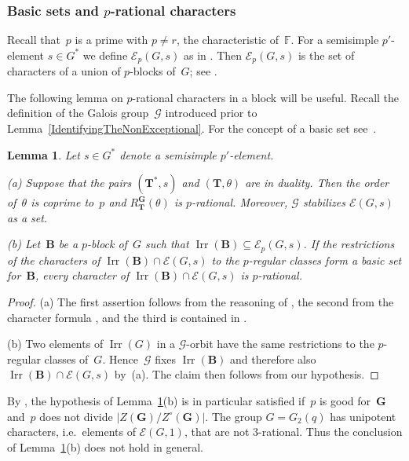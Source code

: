 \documentclass[12pt]{amsart}
\newcommand{\bG}{{\mathbf{G}}}      %
\newcommand{\bB}{{\mathbf{B}}}
\newcommand{\bT}{{\mathbf{T}}}
\DeclareMathOperator{\Irr}{Irr}
\newtheorem{lem}[thm]{Lemma}
\theoremstyle{theorem}
\theoremstyle{definition}
\theoremstyle{remark}
\begin{document}
\addtocounter{subsubsection}{1}
\subsubsection{Basic sets and $p$-rational characters}
\label{BasicSetsPRationalCharacters}
Recall that~$p$ is a prime with $p \neq r$, the characteristic of~$\mathbb{F}$.
For a semisimple $p'$-element $s \in G^*$ we define $\mathcal{E}_p( G, s )$ as 
in \cite[p.~$57$]{BrouMi}. Then $\mathcal{E}_p( G, s )$ is the set of characters 
of a union of $p$-blocks of~$G$; see \cite[Th{\'e}or{\`e}me~$2.2$]{BrouMi}.

The following lemma on $p$-rational characters in a block will be useful. Recall 
the definition of the Galois group~$\mathcal{G}$ introduced prior to
Lemma~\ref{IdentifyingTheNonExceptional}. For the concept of a basic set 
see~\cite[Subsection~$1.1$]{GeHi1}.

\addtocounter{thm}{1}
\begin{lem}
\label{pRationalCharacters}
Let $s \in G^*$ denote a semisimple $p'$-element.

{\rm (a)} Suppose that the pairs $(\bT^*,s)$ and $(\bT,\theta)$ are in duality.
Then the order of~$\theta$ is coprime to~$p$ and $R_{\bT}^{\bG}( \theta )$ is
$p$-rational. Moreover, $\mathcal{G}$ stabilizes $\mathcal{E}( G, s )$ as a set.

{\rm (b)} Let~$\bB$ be a $p$-block of~$G$ such that 
$\Irr( \bB ) \subseteq \mathcal{E}_p( G, s )$. If the restrictions of the 
characters of $\Irr( \bB ) \cap \mathcal{E}( G, s )$ to the $p$-regular classes
form a basic set for~$\bB$, every character of 
$\Irr( \bB ) \cap \mathcal{E}( G, s )$ is $p$-rational.
\end{lem}
\begin{proof}
(a) The first assertion follows from the reasoning of 
\cite[\textit{Remark}~$2.5.15$]{GeMa}, the second from the character formula 
\cite[Theorem~$7.2.8$]{C2}, and the third is contained in 
\cite[Proposition~$3.3.15$]{GeMa}.

(b) Two elements of $\Irr(G)$ in a $\mathcal{G}$-orbit have the same
restrictions to the $p$-regular classes of~$G$. Hence~$\mathcal{G}$ fixes
$\Irr(\bB)$ and therefore also $\Irr( \bB ) \cap \mathcal{E}( G, s )$ by~(a).
The claim then follows from our hypothesis.
\end{proof}

By \cite[Theorem~A]{GeII}, the hypothesis of Lemma~\ref{pRationalCharacters}(b)
is in particular satisfied if~$p$ is good for~$\bG$ and~$p$ does not divide 
$|Z( \bG )/Z^{\circ}( \bG )|$. The group $G = G_2( q )$ has unipotent characters, 
i.e.\ elements of $\mathcal{E}( G, 1 )$, that are not $3$-rational. Thus the
conclusion of Lemma~\ref{pRationalCharacters}(b) does not hold in general. 
\end{document}
